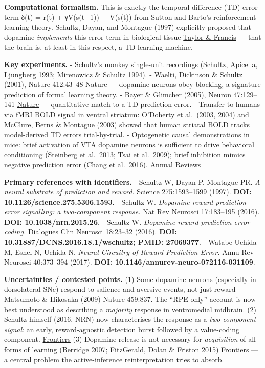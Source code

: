 \textbf{Computational formalism.} This is exactly the temporal-difference (TD) error term δ(t) = r(t) + γV(s(t+1)) − V(s(t)) from Sutton and Barto's reinforcement-learning theory. Schultz, Dayan, and Montague (1997) explicitly proposed that dopamine \emph{implements} this error term in biological tissue \href{https://www.tandfonline.com/doi/full/10.31887/DCNS.2016.18.1/wschultz}{Taylor \& Francis} --- that the brain is, at least in this respect, a TD-learning machine.

\textbf{Key experiments.} - Schultz's monkey single-unit recordings (Schultz, Apicella, Ljungberg 1993; Mirenowicz \& Schultz 1994). - Waelti, Dickinson \& Schultz (2001), Nature 412:43--48 \href{https://www.nature.com/articles/nrn.2015.26}{Nature} --- dopamine neurons obey blocking, a signature prediction of formal learning theory. - Bayer \& Glimcher (2005), Neuron 47:129--141 \href{https://www.nature.com/articles/nrn.2015.26}{Nature} --- quantitative match to a TD prediction error. - Transfer to humans via fMRI BOLD signal in ventral striatum: O'Doherty et al.~(2003, 2004) and McClure, Berns \& Montague (2003) showed that human striatal BOLD tracks model-derived TD errors trial-by-trial. - Optogenetic causal demonstrations in mice: brief activation of VTA dopamine neurons is sufficient to drive behavioral conditioning (Steinberg et al.~2013; Tsai et al.~2009); brief inhibition mimics negative prediction error (Chang et al.~2016). \href{https://www.annualreviews.org/doi/10.1146/annurev-neuro-072116-031109}{Annual Reviews}

\textbf{Primary references with identifiers.} - Schultz W, Dayan P, Montague PR. \emph{A neural substrate of prediction and reward.} Science 275:1593--1599 (1997). \textbf{DOI: 10.1126/science.275.5306.1593}. - Schultz W. \emph{Dopamine reward prediction-error signalling: a two-component response.} Nat Rev Neurosci 17:183--195 (2016). \textbf{DOI: 10.1038/nrn.2015.26}. - Schultz W. \emph{Dopamine reward prediction error coding.} Dialogues Clin Neurosci 18:23--32 (2016). \textbf{DOI: 10.31887/DCNS.2016.18.1/wschultz; PMID: 27069377}. - Watabe-Uchida M, Eshel N, Uchida N. \emph{Neural Circuitry of Reward Prediction Error.} Annu Rev Neurosci 40:373--394 (2017). \textbf{DOI: 10.1146/annurev-neuro-072116-031109}.

\textbf{Uncertainties / contested points.} (1) Some dopamine neurons (especially in dorsolateral SNc) respond to salience and aversive events, not just reward --- Matsumoto \& Hikosaka (2009) Nature 459:837. The ``RPE-only'' account is now best understood as describing a \emph{majority} response in ventromedial midbrain. (2) Schultz himself (2016, NRN) now characterises the response as a \emph{two-component signal}: an early, reward-agnostic detection burst followed by a value-coding component. \href{https://www.frontiersin.org/journals/neuroscience/articles/10.3389/fnins.2023.1171612/full}{Frontiers} (3) Dopamine release is not necessary for \emph{acquisition} of all forms of learning (Berridge 2007; FitzGerald, Dolan \& Friston 2015) \href{https://www.frontiersin.org/journals/computational-neuroscience/articles/10.3389/fncom.2015.00136/full}{Frontiers} --- a central problem the active-inference reinterpretation tries to absorb.

